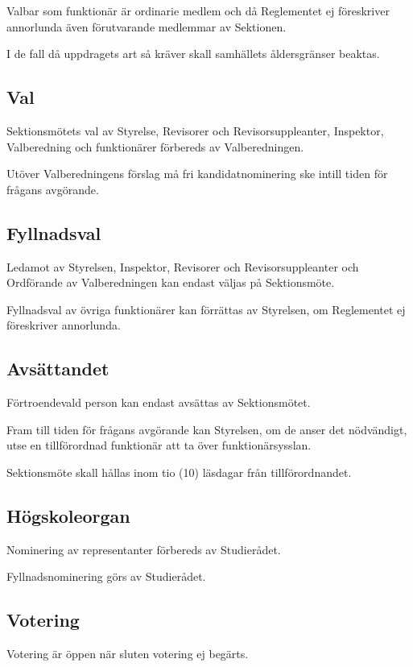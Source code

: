 \documentclass[10pt]{article}
\begin{document}
    Valbar som funktionär är ordinarie medlem och då Reglementet ej föreskriver
    annorlunda även förutvarande medlemmar av Sektionen.
    
    I de fall då uppdragets art så kräver skall samhällets åldersgränser beaktas.
    
    \subsection{Val}
    Sektionsmötets val av Styrelse, Revisorer och
    Revisorsuppleanter, Inspektor, Valberedning och funktionärer förbereds av
    Valberedningen.
    
    Utöver Valberedningens förslag må fri kandidatnominering ske intill tiden
    för frågans avgörande.
    
    \subsection{Fyllnadsval}
    Ledamot av Styrelsen, Inspektor, Revisorer och Revisorsuppleanter och
    Ordförande av Valberedningen kan endast väljas på
    Sektionsmöte.
    
    Fyllnadsval av övriga funktionärer kan förrättas av Styrelsen, om
    Reglementet ej föreskriver annorlunda.
    
    \subsection{Avsättandet}
    Förtroendevald person kan endast avsättas av Sektionsmötet.
    
    Fram till tiden för frågans avgörande kan Styrelsen, om de anser det
    nödvändigt, utse en tillförordnad funktionär att ta över funktionärsysslan.
    
    Sektionsmöte skall hållas inom tio (10) läsdagar från tillförordnandet.
    
    \subsection{Högskoleorgan}
    Nominering av representanter förbereds av Studierådet.
    
    Fyllnadsnominering görs av Studierådet.
    
    \subsection{Votering}
    Votering är öppen när sluten votering ej begärts.
    
\end{document}
